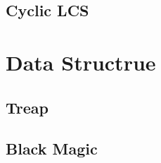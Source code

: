 \documentclass[10pt,twocolumn,oneside]{article}
\begin{document}
\subsection{Cyclic LCS}


\section{Data Structrue}

\subsection{Treap}


\subsection{Black Magic}



% 
\end{document}
